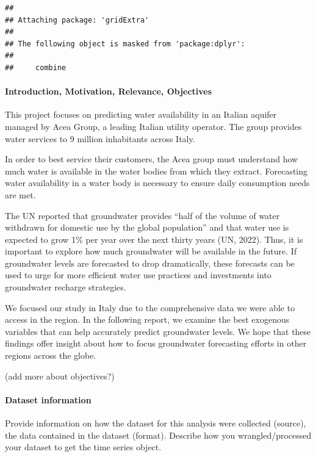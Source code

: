 \documentclass[
]{article}
\begin{document}
\begin{verbatim}
## 
## Attaching package: 'gridExtra'
## 
## The following object is masked from 'package:dplyr':
## 
##     combine
\end{verbatim}

\hypertarget{introduction-motivation-relevance-objectives}{%
\paragraph{Introduction, Motivation, Relevance,
Objectives}\label{introduction-motivation-relevance-objectives}}

This project focuses on predicting water availability in an Italian
aquifer managed by Acea Group, a leading Italian utility operator. The
group provides water services to 9 million inhabitants across Italy.

In order to best service their customers, the Acea group must understand
how much water is available in the water bodies from which they extract.
Forecasting water availability in a water body is necessary to ensure
daily consumption needs are met.

The UN reported that groundwater provides ``half of the volume of water
withdrawn for domestic use by the global population'' and that water use
is expected to grow 1\% per year over the next thirty years (UN, 2022).
Thus, it is important to explore how much groundwater will be available
in the future. If groundwater levels are forecasted to drop
dramatically, these forecasts can be used to urge for more efficient
water use practices and investments into groundwater recharge
strategies.

We focused our study in Italy due to the comprehensive data we were able
to access in the region. In the following report, we examine the best
exogenous variables that can help accurately predict groundwater levels.
We hope that these findings offer insight about how to focus groundwater
forecasting efforts in other regions across the globe.

(add more about objectives?)

\hypertarget{dataset-information}{%
\paragraph{Dataset information}\label{dataset-information}}

Provide information on how the dataset for this analysis were collected
(source), the data contained in the dataset (format). Describe how you
wrangled/processed your dataset to get the time series object.
\end{document}
